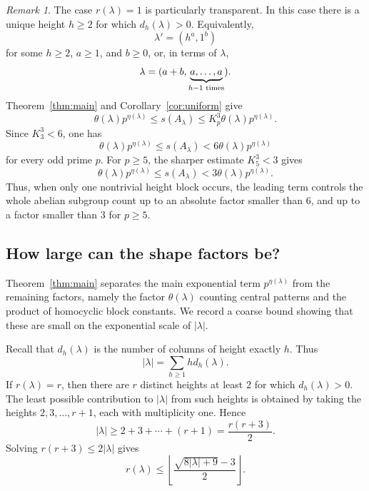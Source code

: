 \documentclass[a4paper,11pt,reqno]{amsart}
\theoremstyle{plain}
\theoremstyle{remark}
\newtheorem{remark}[theorem]{Remark}
\numberwithin{equation}{section}
\renewcommand{\leq}{\leqslant}
\renewcommand{\geq}{\geqslant}
\begin{document}
\begin{remark}
The case $r(\lambda)=1$ is particularly transparent. In this case there is a
unique height $h\geq 2$ for which $d_h(\lambda)>0$. Equivalently,
\[
        \lambda'=(h^a,1^b)
\]
for some $h\geq 2$, $a\geq 1$, and $b\geq 0$, or, in terms of $\lambda$,
\[
        \lambda=(a+b,\underbrace{a,\ldots,a}_{h-1\textnormal{ times}}).
\]
Theorem~\ref{thm:main} and Corollary~\ref{cor:uniform} give
\[
        \theta(\lambda)p^{\eta(\lambda)}
        \leq s(A_\lambda)
        \leq K_p^3\theta(\lambda)p^{\eta(\lambda)}.
\]
Since $K_3^3<6$, one has
\[
        \theta(\lambda)p^{\eta(\lambda)}
        \leq s(A_\lambda)
        <6\theta(\lambda)p^{\eta(\lambda)}
\]
for every odd prime $p$. For $p\geq 5$, the sharper estimate $K_5^3<3$
gives
\[
        \theta(\lambda)p^{\eta(\lambda)}
        \leq s(A_\lambda)
        <3\theta(\lambda)p^{\eta(\lambda)}.
\]
Thus, when only one nontrivial height block occurs, the leading term controls the whole abelian
subgroup count up to an absolute factor smaller than $6$, and up to a factor
smaller than $3$ for $p\geq 5$.
\end{remark}

\subsection{How large can the shape factors be?}

Theorem~\ref{thm:main} separates the main exponential term
$p^{\eta(\lambda)}$ from the remaining factors, 
namely the factor $\theta(\lambda)$ counting central patterns 
and the product of homocyclic block constants.
We record a coarse bound showing that these are small on the
exponential scale of $|\lambda|$.

Recall that $d_h(\lambda)$ is the number of columns of height exactly $h$. Thus
\[
        |\lambda|=\sum_{h\geq 1} h d_h(\lambda).
\]
If $r(\lambda)=r$, then there are $r$ distinct heights at least $2$ for which
$d_h(\lambda)>0$. The least possible contribution to $|\lambda|$ from such
heights is obtained by taking the heights $2,3,\ldots,r+1$, each with
multiplicity one. Hence
\[
        |\lambda|\geq 2+3+\cdots+(r+1)=\frac{r(r+3)}{2}.
\]
Solving $r(r+3)\leq 2|\lambda|$ gives
\[
        r(\lambda)
        \leq
        \left\lfloor \frac{\sqrt{8|\lambda|+9}-3}{2}\right\rfloor.
\]
\end{document}
